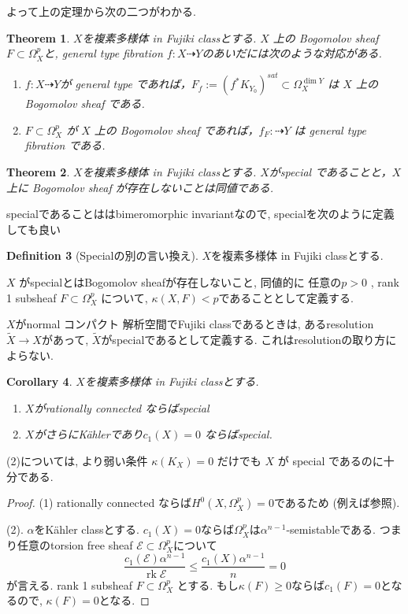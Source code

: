 \documentclass[dvipdfmx,a4paper,11pt]{article} %
\newtheorem{thm}{Theorem}[section]
\newtheorem{cor}[thm]{Corollary}
\theoremstyle{definition}
\newtheorem{defn}[thm]{Definition}
\theoremstyle{remark}
\numberwithin{equation}{section}
\newcommand{\rk}[0]{\operatorname{rk}}
\begin{document}
よって上の定理から次の二つがわかる. 
\begin{thm}\cite[Theorem 2.26]{Cam04}
$X$を複素多様体 in Fujiki classとする. 
\(X\) 上の Bogomolov sheaf \(F \subset \Omega_{X}^p\)と, general type fibration \(f : X\dashrightarrow Y\)のあいだには次のような対応がある. 
\begin{enumerate}
\item \(f : X\dashrightarrow Y\)が general type であれば，\(F_f:= (f^{*}K_{Y_0})^{sat} \subset \Omega_{X}^{\dim Y}\) は \(X\) 上の Bogomolov sheaf である.
\item \(F \subset \Omega_{X}^p\)  が \(X\) 上の Bogomolov sheaf であれば，\(f_F : \dashrightarrow Y\) は general type fibration である.
\end{enumerate}
\end{thm}

\begin{thm}\cite[Theorem 2.27]{Cam04}
\label{thm-Cam04-2.27}
$X$を複素多様体 in Fujiki classとする.
$X$がspecial であることと，\(X\) 上に Bogomolov sheaf が存在しないことは同値である.
\end{thm}

specialであることははbimeromorphic invariantなので, specialを次のように定義しても良い
\begin{defn}[Specialの別の言い換え]
$X$を複素多様体 in Fujiki classとする. 

 \(X\) がspecialとはBogomolov sheafが存在しないこと, 同値的に
任意の\(p>0\) , rank 1 subsheaf \(F \subset \Omega_X^p\) について, \(\kappa(X,F)<p\)であることとして定義する.

$X$がnormal コンパクト 解析空間でFujiki classであるときは, あるresolution $\widetilde{X} \to X$があって, $\widetilde{X}$がspecialであるとして定義する. これはresolutionの取り方によらない. 
\end{defn}

\begin{cor}\cite[Corollary 2.28]{Cam04}
\label{cor-Cam04-2.28}
$X$を複素多様体 in Fujiki classとする. 
\begin{enumerate}
\item $X$がrationally connected ならばspecial
\item $X$がさらにK\"ahlerであり\(c_1(X)=0\) ならばspecial. 
\end{enumerate}
\end{cor}
(2)については, より弱い条件 \(\kappa(K_X)=0\) だけでも \(X\) が special であるのに十分である.
\begin{proof}
(1) rationally connected ならば$H^0(X, \Omega_{X}^{p})=0$であるため (例えば\cite{Deb01}参照).

(2). $\alpha$をK\"ahler classとする. \(c_1(X)=0\)ならば$\Omega_{X}^{p}$は$\alpha^{n-1}$-semistableである. 
つまり任意のtorsion free sheaf $\mathcal{E} \subset \Omega_{X}^{p}$について
$$
\frac{c_1(\mathcal{E}) \alpha^{n-1}}{\rk \mathcal{E}} \le \frac{c_1(X)\alpha^{n-1}}{n}=0
$$
が言える. 
rank 1 subsheaf \(F \subset \Omega_X^p\) とする. 
もし$\kappa(F) \ge 0$ならば$c_1(F)=0$となるので, $\kappa(F) =0$となる. 
\end{proof}
\end{document}
